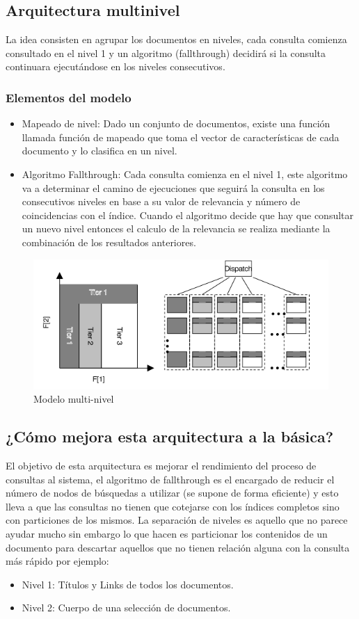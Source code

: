 \documentclass[a4paper, 11pt]{article} %
\begin{document}
		\subsection{Arquitectura multinivel}
		La idea consisten en agrupar los documentos en niveles, cada consulta comienza consultado en el nivel 1 y un algoritmo (fallthrough) decidirá si la consulta continuara ejecutándose en los niveles consecutivos.
		\subsubsection{Elementos del modelo}
		\begin{itemize}
			\item Mapeado de nivel: Dado un conjunto de documentos, existe una función llamada función de mapeado que toma el vector de características de cada documento y lo clasifica en un nivel.
			\item Algoritmo Fallthrough: Cada consulta comienza en el nivel 1, este algoritmo va a determinar el camino de ejecuciones que seguirá la consulta en los consecutivos niveles en base a su valor de relevancia y número de coincidencias con el índice. Cuando el algoritmo decide que hay que consultar un nuevo nivel entonces el calculo de la relevancia se realiza mediante la combinación de los resultados anteriores.
		\end{itemize}
		\begin{figure}[H]
				\centering
				\includegraphics[scale=0.75]{./img/multitier2.png}
				\caption{Modelo multi-nivel}
				\label{fig:my_label}
		\end{figure}
		\subsection{¿Cómo mejora esta arquitectura a la básica?}
		El objetivo de esta arquitectura es mejorar el rendimiento del proceso de consultas al sistema, el algoritmo de fallthrough es el encargado de reducir el número de nodos de búsquedas a utilizar (se supone de forma eficiente) y esto lleva a que las consultas no tienen que cotejarse con los índices completos sino con particiones de los mismos.
		La separación de niveles es aquello que no parece ayudar mucho sin embargo lo que hacen es particionar los contenidos de un documento para descartar aquellos que no tienen relación alguna con la consulta más rápido por ejemplo:
		\begin{itemize}
			\item Nivel 1: Títulos y Links de todos los documentos.
			\item Nivel 2: Cuerpo de una selección de documentos.
		\end{itemize}
\end{document}
